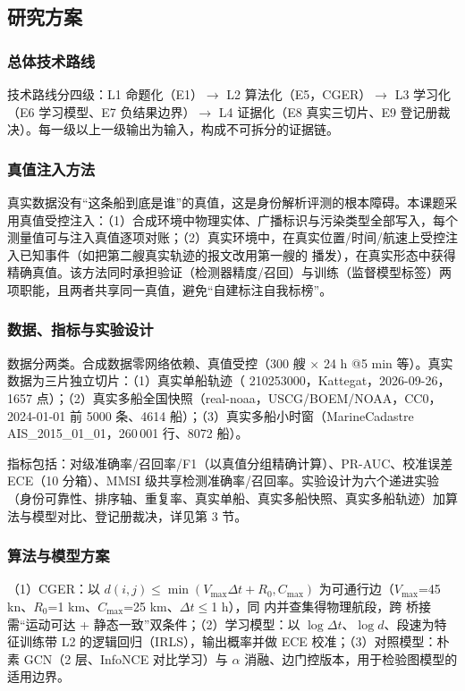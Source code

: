 \documentclass[10.5pt,a4paper]{ctexart}
\newcommand{\mmsi}{\text{MMSI}}
\begin{document}
\subsection{研究方案}
\subsubsection{总体技术路线}
技术路线分四级：L1 命题化（E1）$\rightarrow$ L2 算法化（E5，CGER）$\rightarrow$ L3 学习化（E6 学习模型、E7 负结果边界）$\rightarrow$ L4 证据化（E8 真实三切片、E9 登记册裁决）。每一级以上一级输出为输入，构成不可拆分的证据链。

\subsubsection{真值注入方法}
真实数据没有``这条船到底是谁''的真值，这是身份解析评测的根本障碍。本课题采用真值受控注入：（1）合成环境中物理实体、广播标识与污染类型全部写入，每个测量值可与注入真值逐项对账；（2）真实环境中，在真实位置/时间/航速上受控注入已知事件（如把第二艘真实轨迹的报文改用第一艘的 \mmsi{} 播发），在真实形态中获得精确真值。该方法同时承担验证（检测器精度/召回）与训练（监督模型标签）两项职能，且两者共享同一真值，避免``自建标注自我标榜''。

\subsubsection{数据、指标与实验设计}
数据分两类。合成数据零网络依赖、真值受控（300 艘 $\times$ 24 h @5 min 等）。真实数据为三片独立切片：（1）真实单船轨迹（\mmsi{} 210253000，Kattegat，2026-09-26，1657 点）；（2）真实多船全国快照（real-noaa，USCG/BOEM/NOAA，CC0，2024-01-01 前 5000 条、4614 船）；（3）真实多船小时窗（MarineCadastre AIS\_2015\_01\_01，260\,001 行、8072 船）。

指标包括：对级准确率/召回率/F1（以真值分组精确计算）、PR-AUC、校准误差 ECE（10 分箱）、MMSI 级共享检测准确率/召回率。实验设计为六个递进实验（身份可靠性、排序轴、重复率、真实单船、真实多船快照、真实多船轨迹）加算法与模型对比、登记册裁决，详见第 3 节。

\subsubsection{算法与模型方案}
（1）CGER：以 $d(i,j)\le\min(V_{\max}\Delta t+R_0,C_{\max})$ 为可通行边（$V_{\max}$=45 kn、$R_0$=1 km、$C_{\max}$=25 km、$\Delta t\le$1 h），同 \mmsi{} 内并查集得物理航段，跨 \mmsi{} 桥接需``运动可达 + 静态一致''双条件；（2）学习模型：以 $\log\Delta t$、$\log d$、段速为特征训练带 L2 的逻辑回归（IRLS），输出概率并做 ECE 校准；（3）对照模型：朴素 GCN（2 层、InfoNCE 对比学习）与 $\alpha$ 消融、边门控版本，用于检验图模型的适用边界。
\end{document}
